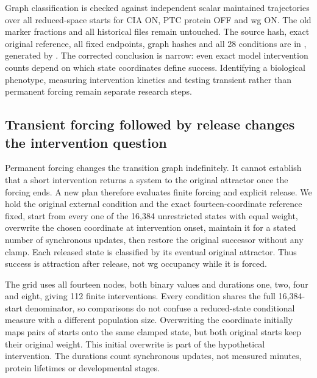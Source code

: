 Graph classification is checked against independent scalar maintained trajectories over all reduced-space starts for CIA ON, PTC protein OFF and wg ON. The old marker fractions and all historical files remain untouched. The source hash, exact original reference, all fixed endpoints, graph hashes and all 28 conditions are in , generated by . The corrected conclusion is narrow: even exact model intervention counts depend on which state coordinates define success. Identifying a biological phenotype, measuring intervention kinetics and testing transient rather than permanent forcing remain separate research steps.

\subsection{Transient forcing followed by release changes the intervention question}
Permanent forcing changes the transition graph indefinitely. It cannot establish that a short intervention returns a system to the original attractor once the forcing ends. A new plan therefore evaluates finite forcing and explicit release. We hold the original external condition and the exact fourteen-coordinate reference fixed, start from every one of the 16,384 unrestricted states with equal weight, overwrite the chosen coordinate at intervention onset, maintain it for a stated number of synchronous updates, then restore the original successor without any clamp. Each released state is classified by its eventual original attractor. Thus success is attraction after release, not wg occupancy while it is forced.

The grid uses all fourteen nodes, both binary values and durations one, two, four and eight, giving 112 finite interventions. Every condition shares the full 16,384-start denominator, so comparisons do not confuse a reduced-state conditional measure with a different population size. Overwriting the coordinate initially maps pairs of starts onto the same clamped state, but both original starts keep their original weight. This initial overwrite is part of the hypothetical intervention. The durations count synchronous updates, not measured minutes, protein lifetimes or developmental stages.

